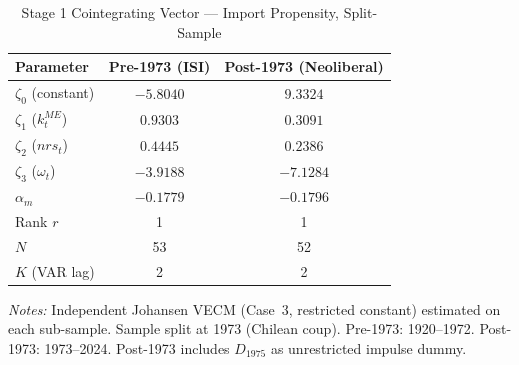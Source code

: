 \begin{table}[htbp]
\centering
\caption{Stage 1 Cointegrating Vector --- Import Propensity, Split-Sample}
\label{tab:stage1_cv1}
\begin{tabular}{lcc}
\toprule
Parameter & Pre-1973 (ISI) & Post-1973 (Neoliberal) \\
\midrule
$\zeta_0$ (constant) & $-5.8040$ & $9.3324$ \\
$\zeta_1$ ($k^{ME}_t$) & $0.9303$ & $0.3091$ \\
$\zeta_2$ ($nrs_t$) & $0.4445$ & $0.2386$ \\
$\zeta_3$ ($\omega_t$) & $-3.9188$ & $-7.1284$ \\
\midrule
$\alpha_m$ & $-0.1779$ & $-0.1796$ \\
Rank $r$ & 1 & 1 \\
$N$ & 53 & 52 \\
$K$ (VAR lag) & 2 & 2 \\
\bottomrule
\end{tabular}
\vspace{0.5em}
\begin{minipage}{0.85\textwidth}
\footnotesize
\textit{Notes:} Independent Johansen VECM (Case~3, restricted constant)
estimated on each sub-sample. Sample split at 1973 (Chilean coup).
Pre-1973: 1920--1972. Post-1973: 1973--2024.
Post-1973 includes $D_{1975}$ as unrestricted impulse dummy.
\end{minipage}
\end{table}
